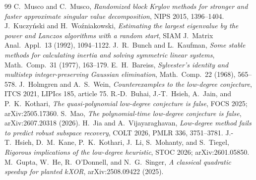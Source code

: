 \documentclass[11pt]{article}
\theoremstyle{definition}
\theoremstyle{remark}
\newcommand{\1}{\mathbf 1}
\numberwithin{equation}{section}
\begin{document}
\begin{thebibliography}{99}
 C.~Musco and C.~Musco, \emph{Randomized block Krylov methods for stronger and faster approximate singular value decomposition}, NIPS 2015, 1396--1404.
 J.~Kuczy\'nski and H.~Wo\'zniakowski, \emph{Estimating the largest eigenvalue by the power and Lanczos algorithms with a random start}, SIAM J.\ Matrix Anal.\ Appl.\ 13 (1992), 1094--1122.
 J.~R.~Bunch and L.~Kaufman, \emph{Some stable methods for calculating inertia and solving symmetric linear systems}, Math.\ Comp.\ 31 (1977), 163--179.
 E.~H.~Bareiss, \emph{Sylvester's identity and multistep integer-preserving Gaussian elimination}, Math.\ Comp.\ 22 (1968), 565--578.
 J.~Holmgren and A.~S.~Wein, \emph{Counterexamples to the low-degree conjecture}, ITCS 2021, LIPIcs 185, article 75.
 R.-D.~Buhai, J.-T.~Hsieh, A.~Jain, and P.~K.~Kothari, \emph{The quasi-polynomial low-degree conjecture is false}, FOCS 2025; arXiv:2505.17360.
 S.~Mao, \emph{The polynomial-time low-degree conjecture is false}, arXiv:2607.20318 (2026).
 H.~Jia and A.~Vijayaraghavan, \emph{Low-degree method fails to predict robust subspace recovery}, COLT 2026, PMLR 336, 3751--3781.
 J.-T.~Hsieh, D.~M.~Kane, P.~K.~Kothari, J.~Li, S.~Mohanty, and S.~Tiegel, \emph{Rigorous implications of the low-degree heuristic}, STOC 2026; arXiv:2601.05850.
 M.~Gupta, W.~He, R.~O'Donnell, and N.~G.~Singer, \emph{A classical quadratic speedup for planted $k$XOR}, arXiv:2508.09422 (2025).
\end{thebibliography}
\end{document}
